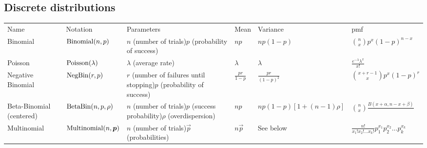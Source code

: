 \documentclass[thesis.tex]{subfiles}
\begin{document}
\begin{landscape}
\section{Discrete distributions}
\begin{tabular}{llp{3.5cm}lll}
Name & Notation & Parameters & Mean & Variance & pmf \\
Binomial & $\operatorname{Binomial}(n, p)$ & $n$ (number of trials)\newline $p$ (probability of success) & $np$ & $np(1-p)$ & ${n \choose x}p^x(1-p)^{n-x}$ \\
Poisson & $\operatorname{Poisson}(\lambda)$ & $\lambda$ (average rate) & $\lambda$ & $\lambda$ & $\frac{e^{-\lambda}\lambda^x}{x!}$ \\
Negative Binomial & $\operatorname{NegBin}(r, p)$ & $r$ (number of failures until stopping)\newline $p$ (probability of success) & $\frac{pr}{1-p}$ & $\frac{pr}{(1-p)^2}$ & ${x + r - 1 \choose x} p^x (1-p)^r$ \\
Beta-Binomial (centered) & $\operatorname{BetaBin}(n, p, \rho)$ & $n$ (number of trials)\newline $p$ (success probability)\newline $\rho$ (overdispersion) & $np$ & $np(1-p)[1+(n-1)\rho]$ & ${n \choose x} \frac{B(x+\alpha, n-x+\beta)}{}$ \\
Multinomial & $\operatorname{Multinomial}(n, \bm{p})$ & $n$ (number of trials)\newline $\vec{p}$ (probabilities) & $n \vec{p}$ & See below & $\frac{n!}{x_1!x_2!\ldots x_k!}p_1^{x_1}p_2^{x_2}\ldots p_k^{x_k}$ \\
\end{tabular}
\end{landscape}
\end{document}
